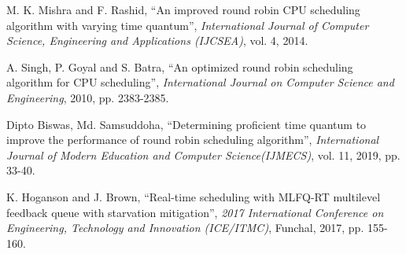 \documentclass[conference]{IEEEtran}
\begin{document}
\begin{thebibliography}{00}
 M. K. Mishra and F. Rashid, ``An improved round robin CPU scheduling algorithm with varying time quantum'', \textit{International Journal of Computer Science, Engineering and Applications  (IJCSEA)}, vol. 4, 2014.

 A. Singh, P. Goyal and S. Batra, ``An optimized round robin scheduling algorithm for CPU scheduling'', \textit{International Journal on Computer Science and Engineering}, 2010, pp. 2383-2385.

 Dipto Biswas, Md. Samsuddoha, ``Determining proficient time quantum to  improve the performance  of  round  robin  scheduling  algorithm'', \textit{International  Journal  of  Modern  Education  and  Computer Science(IJMECS)}, vol. 11, 2019, pp. 33-40.

 K. Hoganson and J. Brown, ``Real-time scheduling with MLFQ-RT multilevel feedback queue with starvation mitigation'', \textit{2017 International Conference on Engineering, Technology and Innovation (ICE/ITMC)}, Funchal, 2017, pp. 155-160.

\end{thebibliography}
\end{document}

